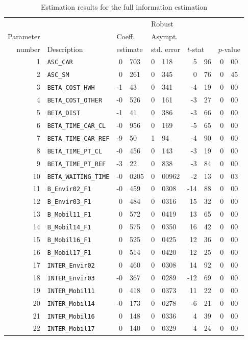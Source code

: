 \documentclass[12pt,a4paper]{article}
\begin{document}
 \begin{table}[htb]
\caption{\label{tab:fi}Estimation results for the full information estimation}
\begin{tabular}{rlr@{.}lr@{.}lr@{.}lr@{.}l}
         &                       &   \multicolumn{2}{l}{}    & \multicolumn{2}{l}{Robust}  &     \multicolumn{4}{l}{}   \\
Parameter &                       &   \multicolumn{2}{l}{Coeff.}      & \multicolumn{2}{l}{Asympt.}  &     \multicolumn{4}{l}{}   \\
number &  Description                     &   \multicolumn{2}{l}{estimate}      & \multicolumn{2}{l}{std. error}  &   \multicolumn{2}{l}{$t$-stat}  &   \multicolumn{2}{l}{$p$-value}   \\

\hline

1 & \lstinline$ASC_CAR$ & 0&703 & 0&118 & 5&96 & 0&00\\
2 & \lstinline$ASC_SM$ & 0&261 & 0&345 & 0&76 & 0&45\\
3 & \lstinline$BETA_COST_HWH$ & -1&43 & 0&341 & -4&19 & 0&00\\
4 & \lstinline$BETA_COST_OTHER$ & -0&526 & 0&161 & -3&27 & 0&00\\
5 & \lstinline$BETA_DIST$ & -1&41 & 0&386 & -3&66 & 0&00\\
6 & \lstinline$BETA_TIME_CAR_CL$ & -0&956 & 0&169 & -5&65 & 0&00\\
7 & \lstinline$BETA_TIME_CAR_REF$ & -9&50 & 1&94 & -4&90 & 0&00\\
8 & \lstinline$BETA_TIME_PT_CL$ & -0&456 & 0&143 & -3&19 & 0&00\\
9 & \lstinline$BETA_TIME_PT_REF$ & -3&22 & 0&838 & -3&84 & 0&00\\
10 & \lstinline$BETA_WAITING_TIME$ & -0&0205 & 0&00962 & -2&13 & 0&03\\
11 & \lstinline$B_Envir02_F1$ & -0&459 & 0&0308 & -14&88 & 0&00\\
12 & \lstinline$B_Envir03_F1$ & 0&484 & 0&0316 & 15&32 & 0&00\\
13 & \lstinline$B_Mobil11_F1$ & 0&572 & 0&0419 & 13&65 & 0&00\\
14 & \lstinline$B_Mobil14_F1$ & 0&575 & 0&0350 & 16&42 & 0&00\\
15 & \lstinline$B_Mobil16_F1$ & 0&525 & 0&0425 & 12&36 & 0&00\\
16 & \lstinline$B_Mobil17_F1$ & 0&514 & 0&0420 & 12&25 & 0&00\\
17 & \lstinline$INTER_Envir02$ & 0&460 & 0&0308 & 14&92 & 0&00\\
18 & \lstinline$INTER_Envir03$ & -0&367 & 0&0289 & -12&69 & 0&00\\
19 & \lstinline$INTER_Mobil11$ & 0&418 & 0&0373 & 11&22 & 0&00\\
20 & \lstinline$INTER_Mobil14$ & -0&173 & 0&0278 & -6&21 & 0&00\\
21 & \lstinline$INTER_Mobil16$ & 0&148 & 0&0336 & 4&39 & 0&00\\
22 & \lstinline$INTER_Mobil17$ & 0&140 & 0&0329 & 4&24 & 0&00\\
\end{tabular}
  \end{table}
\end{document}
